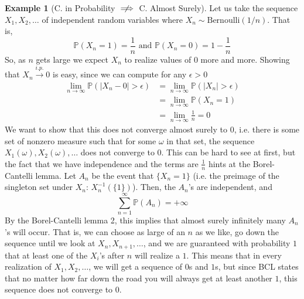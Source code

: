 \documentclass{article}
\theoremstyle{definition}
\newtheorem{example}{Example}[section]
\theoremstyle{remark}
\theoremstyle{definition}
\begin{document}
\begin{example}[C. in Probability $\centernot\implies$ C. Almost Surely]
Let us take the sequence $X_1, X_2, \ldots$ of independent random variables where $X_n \sim \mathrm{Bernoulli}(1/n)$. That is, 
\[\mathbb{P}(X_n = 1) = \frac{1}{n} \text{ and } \mathbb{P}(X_n = 0) = 1 - \frac{1}{n}\]
So, as $n$ gets large we expect $X_n$ to realize values of $0$ more and more. Showing that $X_n \xrightarrow{i.p.} 0$ is easy, since we can compute for any $\epsilon > 0$
\begin{align*}
    \lim_{n \rightarrow \infty} \mathbb{P}(|X_n - 0| > \epsilon) & = \lim_{n \rightarrow \infty} \mathbb{P}(|X_n| > \epsilon) \\
    & = \lim_{n \rightarrow \infty} \mathbb{P}(X_n = 1) \\
    & = \lim_{n \rightarrow \infty} \frac{1}{n} = 0
\end{align*}
We want to show that this does not converge almost surely to $0$, i.e. there is some set of nonzero measure such that for some $\omega$ in that set, the sequence $X_1 (\omega), X_2(\omega), \ldots$ does not converge to $0$. This can be hard to see at first, but the fact that we have independence and the terms are $\frac{1}{n}$ hints at the Borel-Cantelli lemma. Let $A_n$ be the event that $\{X_n = 1\}$ (i.e. the preimage of the singleton set under $X_n$: $X_n^{-1} ( \{1\})$). Then, the $A_n$'s are independent, and 
\[\sum_{n=1}^\infty \mathbb{P}(A_n) = +\infty \]
By the Borel-Cantelli lemma 2, this implies that almost surely infinitely many $A_n$'s will occur. That is, we can choose as large of an $n$ as we like, go down the sequence until we look at $X_n, X_{n+1}, \ldots$, and we are guaranteed with probability $1$ that at least one of the $X_i$'s after $n$ will realize a $1$. This means that in every realization of $X_1, X_2, \ldots$, we will get a sequence of $0$s and $1$s, but since BCL states that no matter how far down the road you will always get at least another $1$, this sequence does not converge to $0$.  
\end{example}
\end{document}

